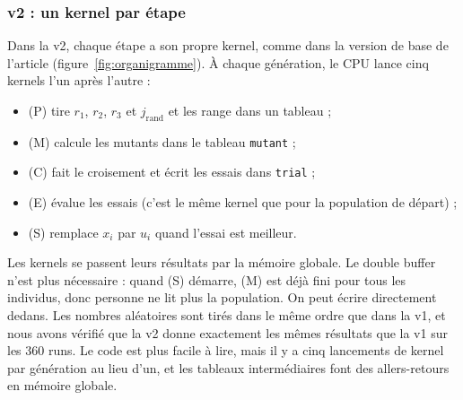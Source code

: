 \documentclass[conference]{IEEEtran}
\begin{document}
\subsubsection{v2 : un kernel par \'etape}
Dans la v2, chaque \'etape a son propre kernel, comme dans la version de base de l'article \cite{qin} (figure~\ref{fig:organigramme}). \`A chaque g\'en\'eration, le CPU lance cinq kernels l'un apr\`es l'autre :
\begin{itemize}
\item (P) tire $r_1$, $r_2$, $r_3$ et $j_{\mathrm{rand}}$ et les range dans un tableau ;
\item (M) calcule les mutants dans le tableau \texttt{mutant} ;
\item (C) fait le croisement et \'ecrit les essais dans \texttt{trial} ;
\item (E) \'evalue les essais (c'est le m\^eme kernel que pour la population de d\'epart) ;
\item (S) remplace $x_i$ par $u_i$ quand l'essai est meilleur.
\end{itemize}
Les kernels se passent leurs r\'esultats par la m\'emoire globale. Le double buffer n'est plus n\'ecessaire : quand (S) d\'emarre, (M) est d\'ej\`a fini pour tous les individus, donc personne ne lit plus la population. On peut \'ecrire directement dedans. Les nombres al\'eatoires sont tir\'es dans le m\^eme ordre que dans la v1, et nous avons v\'erifi\'e que la v2 donne exactement les m\^emes r\'esultats que la v1 sur les 360 runs. Le code est plus facile \`a lire, mais il y a cinq lancements de kernel par g\'en\'eration au lieu d'un, et les tableaux interm\'ediaires font des allers-retours en m\'emoire globale.
\end{document}
